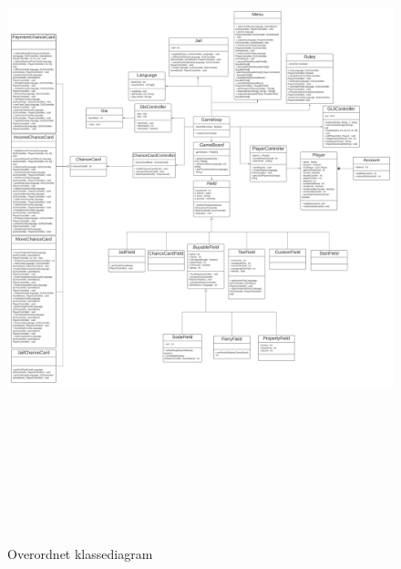 \begin{flushleft}
\begin{figure}[H]
    \centering
    \includegraphics[width=16cm, height = 20cm]{Report/figures/Klassediagram/klassediagram_storenavne.png}
    \caption{Overordnet klassediagram}
    \label{Klassediagram}
\end{figure}


\end{flushleft}
